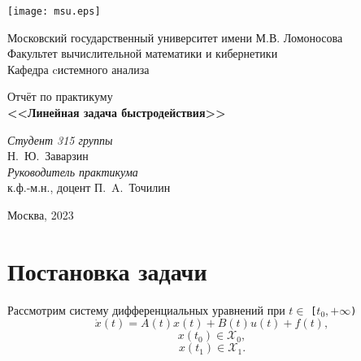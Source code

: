 \documentclass[a4paper,11pt]{article}
\begin{document}
\newcommand{\sgn}{\mathrm{sgn}}

\begin{titlepage}
\begin{center}
\texttt{[image: msu.eps]}
\end{center}

\begin{center}
Московский государственный университет имени М.В. Ломоносова\\
\vspace{0.2cm}
Факультет вычислительной математики и кибернетики\\
\vspace{0.2cm}
Кафедра cистемного анализа

\vspace{4cm}
{\LARGE Отчёт по практикуму}\\
\vspace{1cm}
{\Huge\bfseries <<Линейная задача быстродействия>>}
\end{center}

\vspace{2cm}
\begin{flushright}
\large
\textit{Студент 315 группы}\\
Н.~Ю.~Заварзин\\
\vspace{5mm}
\textit{Руководитель практикума}\\
к.ф.-м.н., доцент П.~A.~Точилин\\
\end{flushright}
\vspace{5cm}

\begin{center}
Москва, 2023
\end{center}
\end{titlepage}

\newpage
\section{Постановка задачи}
Рассмотрим систему дифференциальных уравнений при $t \in$ \texttt{[$t_0,+\infty$)}
\begin{equation}\label{eq1}
\dot{x}(t) = A(t)x(t) + B(t)u(t) + f(t),
\end{equation}
\begin{equation*}
x(t_0) \in \mathcal{X}_0,
\end{equation*}
\begin{equation*}
x(t_1) \in \mathcal{X}_1. 
\end{equation*} 
\end{document}
